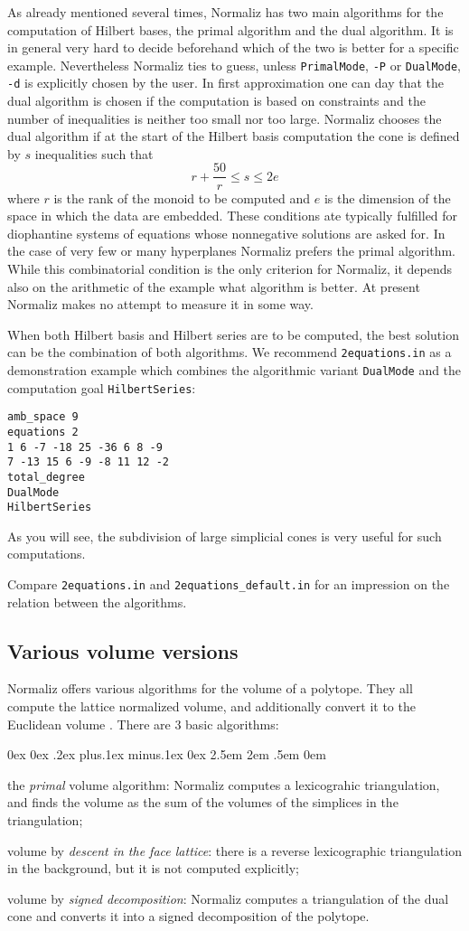 \documentclass[12pt,a4paper]{scrartcl}
\newcounter{listi}
\newcommand{\stdli}{ \topsep0ex \partopsep0ex %
\parsep.2ex plus.1ex minus.1ex \itemsep0ex%
\leftmargin2.5em \labelwidth2em \labelsep.5em \rightmargin0em}%
\newenvironment{arab}{\begin{list}{\textup{(\arabic{listi})}}%
	{\usecounter{listi}\stdli}}{\end{list}}
\theoremstyle{definition}
\begin{document}
As already mentioned several times, Normaliz has two main algorithms for the computation of Hilbert bases, the primal algorithm and the dual algorithm. It is in general very hard to decide beforehand which of the two is better for a specific example. Nevertheless Normaliz ties to guess, unless \verb|PrimalMode|, \verb|-P| or \verb|DualMode|, \verb|-d| is explicitly chosen by the user. In first approximation one can day that the dual algorithm is chosen if the computation is based on constraints and the number of inequalities is neither too small nor too large. Normaliz chooses the dual algorithm if at the start of the Hilbert basis computation the cone is defined by $s$ inequalities such that
$$
r+\frac{50}{r} \le s \le 2e
$$
where $r$ is the rank of the monoid to be computed and $e$ is the dimension of the space in which the data are embedded. These conditions ate typically fulfilled for diophantine systems of equations whose nonnegative solutions are asked for.
In the case of very few or many hyperplanes Normaliz prefers the primal algorithm. While this combinatorial condition is the only criterion for Normaliz, it depends also on the arithmetic of the example what algorithm is better. At present Normaliz makes no attempt to measure it in some way.

When both Hilbert basis and Hilbert series are to be computed, the best solution can be the combination of both algorithms. We recommend \verb|2equations.in| as a demonstration example which combines the algorithmic variant \verb|DualMode| and the computation goal \verb|HilbertSeries|:
\begin{Verbatim}
amb_space 9
equations 2
1 6 -7 -18 25 -36 6 8 -9
7 -13 15 6 -9 -8 11 12 -2
total_degree
DualMode
HilbertSeries
\end{Verbatim}
As you will see, the subdivision of large simplicial cones is very useful for such computations.

Compare \verb|2equations.in| and \verb|2equations_default.in| for an impression on the relation between the algorithms.

\subsection{Various volume versions}\label{VariousVolumes}

Normaliz offers various algorithms for the volume of a polytope. They all compute the lattice normalized volume, and additionally convert it to the Euclidean volume . There are $3$ basic algorithms:
\begin{arab}
\item the \emph{primal} volume algorithm: Normaliz computes a lexicograhic triangulation, and finds the volume as the sum of the volumes of the simplices in the triangulation;
\item volume by \emph{descent in the face lattice}: there is a reverse lexicographic triangulation  in the background, but it is not computed explicitly;
\item volume by \emph{signed decomposition}: Normaliz computes a triangulation of the dual cone and converts it into a signed decomposition of the polytope.
\end{arab}
\end{document}
